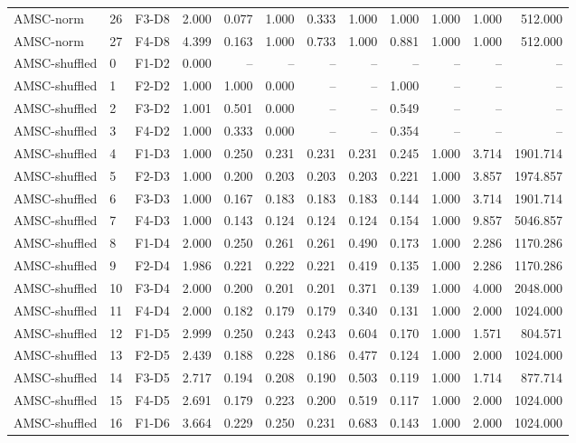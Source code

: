 \begin{table}[ht]
\begin{tabular}{lllrrrrrrrrr}
AMSC-norm & 26 & F3-D8 & 2.000 & 0.077 & 1.000 & 0.333 & 1.000 & 1.000 & 1.000 & 1.000 & 512.000 \\
AMSC-norm & 27 & F4-D8 & 4.399 & 0.163 & 1.000 & 0.733 & 1.000 & 0.881 & 1.000 & 1.000 & 512.000 \\
AMSC-shuffled & 0 & F1-D2 & 0.000 & -- & -- & -- & -- & -- & -- & -- & -- \\
AMSC-shuffled & 1 & F2-D2 & 1.000 & 1.000 & 0.000 & -- & -- & 1.000 & -- & -- & -- \\
AMSC-shuffled & 2 & F3-D2 & 1.001 & 0.501 & 0.000 & -- & -- & 0.549 & -- & -- & -- \\
AMSC-shuffled & 3 & F4-D2 & 1.000 & 0.333 & 0.000 & -- & -- & 0.354 & -- & -- & -- \\
AMSC-shuffled & 4 & F1-D3 & 1.000 & 0.250 & 0.231 & 0.231 & 0.231 & 0.245 & 1.000 & 3.714 & 1901.714 \\
AMSC-shuffled & 5 & F2-D3 & 1.000 & 0.200 & 0.203 & 0.203 & 0.203 & 0.221 & 1.000 & 3.857 & 1974.857 \\
AMSC-shuffled & 6 & F3-D3 & 1.000 & 0.167 & 0.183 & 0.183 & 0.183 & 0.144 & 1.000 & 3.714 & 1901.714 \\
AMSC-shuffled & 7 & F4-D3 & 1.000 & 0.143 & 0.124 & 0.124 & 0.124 & 0.154 & 1.000 & 9.857 & 5046.857 \\
AMSC-shuffled & 8 & F1-D4 & 2.000 & 0.250 & 0.261 & 0.261 & 0.490 & 0.173 & 1.000 & 2.286 & 1170.286 \\
AMSC-shuffled & 9 & F2-D4 & 1.986 & 0.221 & 0.222 & 0.221 & 0.419 & 0.135 & 1.000 & 2.286 & 1170.286 \\
AMSC-shuffled & 10 & F3-D4 & 2.000 & 0.200 & 0.201 & 0.201 & 0.371 & 0.139 & 1.000 & 4.000 & 2048.000 \\
AMSC-shuffled & 11 & F4-D4 & 2.000 & 0.182 & 0.179 & 0.179 & 0.340 & 0.131 & 1.000 & 2.000 & 1024.000 \\
AMSC-shuffled & 12 & F1-D5 & 2.999 & 0.250 & 0.243 & 0.243 & 0.604 & 0.170 & 1.000 & 1.571 & 804.571 \\
AMSC-shuffled & 13 & F2-D5 & 2.439 & 0.188 & 0.228 & 0.186 & 0.477 & 0.124 & 1.000 & 2.000 & 1024.000 \\
AMSC-shuffled & 14 & F3-D5 & 2.717 & 0.194 & 0.208 & 0.190 & 0.503 & 0.119 & 1.000 & 1.714 & 877.714 \\
AMSC-shuffled & 15 & F4-D5 & 2.691 & 0.179 & 0.223 & 0.200 & 0.519 & 0.117 & 1.000 & 2.000 & 1024.000 \\
AMSC-shuffled & 16 & F1-D6 & 3.664 & 0.229 & 0.250 & 0.231 & 0.683 & 0.143 & 1.000 & 2.000 & 1024.000 \\

\end{tabular}
\end{table}
